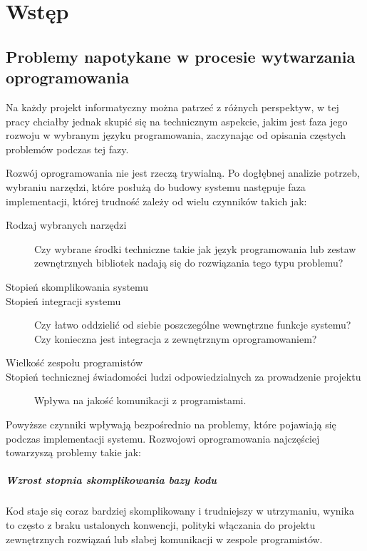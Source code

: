 
\nocite{ruby_way}
\nocite{rails_guides}
\nocite{polish_ruby_forum}

\chapter[Wstęp]{Wstęp}
	\section{Problemy napotykane w procesie wytwarzania oprogramowania}
	  Na każdy projekt informatyczny można patrzeć z różnych perspektyw, w tej pracy chciałby jednak skupić się na technicznym aspekcie, jakim jest faza jego rozwoju w wybranym języku programowania, zaczynając od opisania częstych problemów podczas tej fazy.
	  
	  Rozwój oprogramowania nie jest rzeczą trywialną. Po dogłębnej analizie potrzeb, wybraniu narzędzi, które posłużą do budowy systemu następuje faza implementacji, której trudność zależy od wielu czynników takich jak:
	  
	  \begin{description}
	    \item[Rodzaj wybranych narzędzi] Czy wybrane środki techniczne takie jak język programowania lub zestaw zewnętrznych bibliotek nadają się do rozwiązania tego typu problemu?
	    \item[Stopień skomplikowania systemu]
	    \item[Stopień integracji systemu] Czy łatwo oddzielić od siebie poszczególne wewnętrzne funkcje systemu? Czy konieczna jest integracja z zewnętrznym oprogramowaniem?
	    \item[Wielkość zespołu programistów]
	    \item[Stopień technicznej świadomości ludzi odpowiedzialnych za prowadzenie projektu] Wpływa na jakość komunikacji z programistami.
	  \end{description}
	  
	  Powyższe czynniki wpływają bezpośrednio na problemy, które pojawiają się podczas implementacji systemu. Rozwojowi oprogramowania najczęściej towarzyszą problemy takie jak:
	  
	  \paragraph{Wzrost stopnia skomplikowania bazy kodu}
	    Kod staje się coraz bardziej skomplikowany i trudniejszy w utrzymaniu, wynika to często z braku ustalonych konwencji, polityki włączania do projektu zewnętrznych rozwiązań lub słabej komunikacji w zespole programistów.
